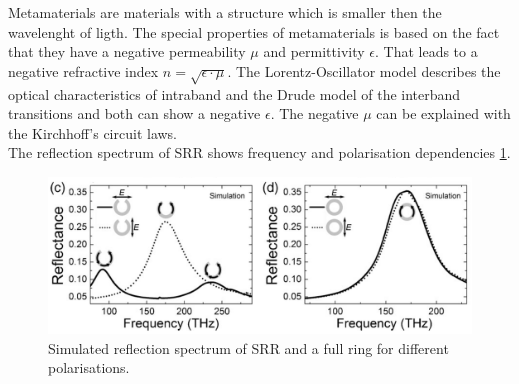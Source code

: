 Metamaterials are materials with a structure which is smaller then the wavelenght of ligth. The special properties of metamaterials is  based on the fact that they have a negative permeability $\mu$ and permittivity $\epsilon$. That leads to a negative refractive index $n = \sqrt{\epsilon \cdot \mu}$. 
The Lorentz-Oscillator model describes the optical characteristics of intraband  and the Drude model of the interband transitions and both can show  a negative $\epsilon$. The negative $\mu$ can be explained with the Kirchhoff's circuit laws. \\
The reflection spectrum of SRR shows frequency and polarisation dependencies \ref{spectrum_theory}.
\begin{figure}[H]
\centering
\includegraphics[scale=1]{../figures/spectrum_theory.png}
\caption{Simulated reflection spectrum of SRR and a full ring for different polarisations. \cite{paper_Giessen_meta}  }
    \label{spectrum_theory}
\end{figure}
